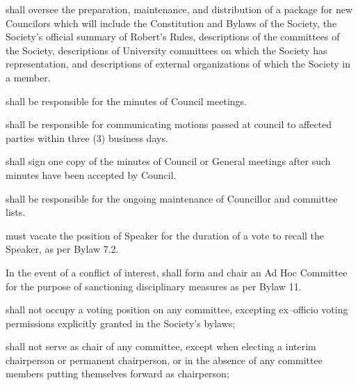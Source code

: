 \begin{longenum}[ label*=\thesubsection.\arabic*., align=left]
    \item shall oversee the preparation, maintenance, and distribution of a package for new Councilors which will include the Constitution and Bylaws of the Society, the Society's official summary of Robert's Rules, descriptions of the committees of the Society, descriptions of University committees on which the Society has representation, and descriptions of external organizations of which the Society in a member.
    \item shall be responsible for the minutes of Council meetings.
    \item shall be responsible for communicating motions passed at council to affected parties within three (3) business days. 
    \item shall sign one copy of the minutes of Council or General meetings after such minutes have been accepted by Council.
    \item shall be responsible for the ongoing maintenance of Councillor and committee lists.
    \item must vacate the position of Speaker for the duration of a vote to recall the Speaker, as per Bylaw 7.2.
    \item In the event of a conflict of interest, shall form and chair an Ad Hoc Committee for the purpose of sanctioning disciplinary measures as per Bylaw 11.
     \item shall not occupy a voting position on any committee, excepting ex--officio voting permissions explicitly granted in the Society's bylaws;
	\item shall not serve as chair of any committee, except when electing a interim chairperson or permanent chairperson, or in the absence of any committee members putting themselves forward as chairperson;
\end{longenum}

